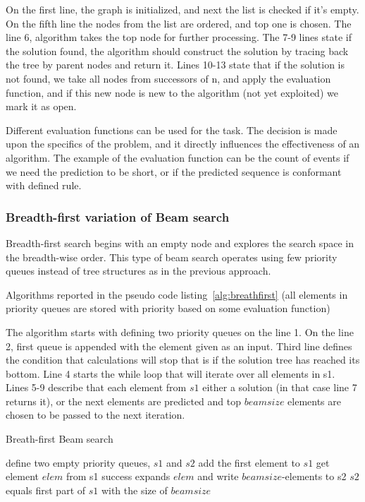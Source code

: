On the first line, the graph is initialized, and next the list is checked if it's empty. On the fifth line the nodes from the list are ordered, and top one is chosen. The line 6, algorithm takes the top node for further processing. The 7-9 lines state if the solution found, the algorithm should construct the solution by tracing back the tree by parent nodes and return it. Lines 10-13 state that if the solution is not found, we take all nodes from successors of n, and apply the evaluation function, and if this new node is new to the algorithm (not yet exploited) we mark it as open.

Different evaluation functions can be used for the task. The decision is made upon the specifics of the problem, and it directly influences the effectiveness of an algorithm. The example of the evaluation function can be the count of events if we need the prediction to be short, or if the predicted sequence is conformant with defined rule.

\subsubsection{Breadth-first variation of Beam search}

Breadth-first search begins with an empty node and explores the search space in the breadth-wise order. This type of beam search operates using few priority queues instead of tree structures as in the previous approach. 

Algorithms reported in the pseudo code listing~\ref{alg:breathfirst} (all elements in priority queues are stored with priority based on some evaluation function)

The algorithm starts with defining two priority queues on the line 1. On the line 2, first queue is appended with the element given as an input. Third line defines the condition that calculations will stop that is if the solution tree has reached its bottom. Line 4 starts the while loop that will iterate over all elements in s1. Lines 5-9 describe that each element from $s1$ either a solution (in that case line 7 returns it), or the next elements are predicted and top $beamsize$ elements are chosen to be passed to the next iteration.


\begin{algorithm}
 	\caption{Breath-first Beam search}
	\label{alg:breathfirst}
	\begin{algorithmic}[1]
		\State define two empty priority queues, $s1$ and $s2$
		\State add the first element to $s1$
				\State get element $elem$ from s1
					\State	success
					\EndIf
					\State expands $elem$ and write $beamsize$-elements to s2
					\EndWhile
					\State $s2$ equals first part of $s1$ with the size of $beamsize$
					\EndWhile
	\end{algorithmic}
\end{algorithm}




